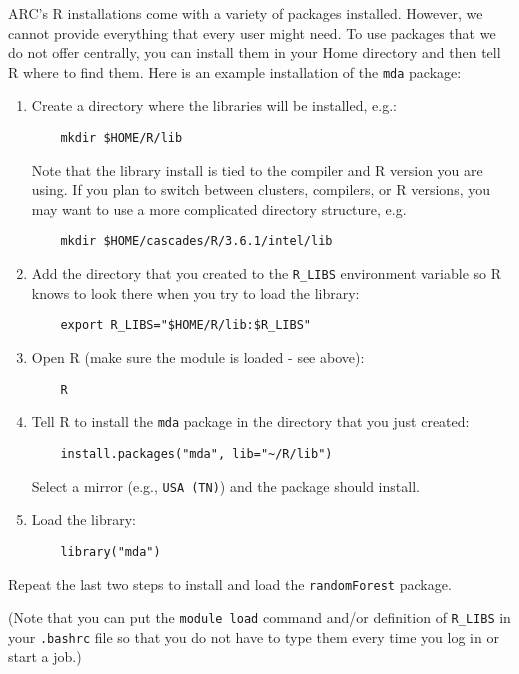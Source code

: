 ARC's R installations come with a variety of packages installed. However, we cannot provide everything that every user might need. To use packages that we do not offer centrally, you can install them in your Home directory and then tell R where to find them. Here is an example installation of the \texttt{mda} package:

\begin{enumerate}
  \item Create a directory where the libraries will be installed, e.g.:
    \begin{verbatim}
    mkdir $HOME/R/lib
    \end{verbatim}
Note that the library install is tied to the compiler and R version you are using. If you plan to switch between clusters, compilers, or R versions, you may want to use a more complicated directory structure, e.g. 
    \begin{verbatim}
    mkdir $HOME/cascades/R/3.6.1/intel/lib
    \end{verbatim}
  \item Add the directory that you created to the \texttt{R\_LIBS} environment variable so R knows to look there when you try to load the library:
    \begin{verbatim}
    export R_LIBS="$HOME/R/lib:$R_LIBS"
    \end{verbatim}
  \item Open R (make sure the module is loaded - see above):
    \begin{verbatim}
    R
    \end{verbatim}
  \item Tell R to install the \texttt{mda} package in the directory that you just created:
    \begin{verbatim}
    install.packages("mda", lib="~/R/lib")
    \end{verbatim}
Select a mirror (e.g., \texttt{USA (TN)}) and the package should install.
  \item Load the library:
    \begin{verbatim}
    library("mda")
    \end{verbatim}
\end{enumerate}
Repeat the last two steps to install and load the \texttt{randomForest} package.

(Note that you can put the \texttt{module load} command and/or definition of \texttt{R\_LIBS} in your \texttt{.bashrc} file so that you do not have to type them every time you log in or start a job.)

